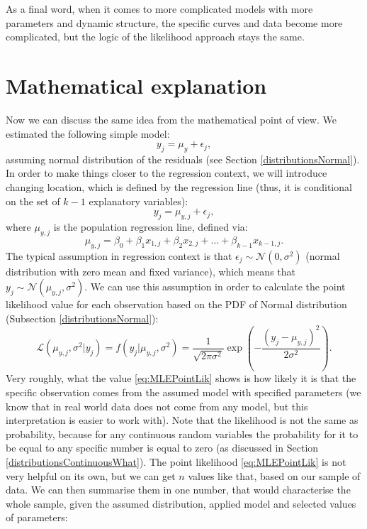 \documentclass[
]{book}
\theoremstyle{definition}
\theoremstyle{definition}
\theoremstyle{definition}
\theoremstyle{definition}
\theoremstyle{remark}
\begin{document}
As a final word, when it comes to more complicated models with more parameters and dynamic structure, the specific curves and data become more complicated, but the logic of the likelihood approach stays the same.

\section{Mathematical explanation}\label{likelihoodApproachMaths}

Now we can discuss the same idea from the mathematical point of view. We estimated the following simple model:
\begin{equation}
    y_j = \mu_{y} + \epsilon_j,
    \label{eq:MLEConstant}
\end{equation}
assuming normal distribution of the residuals (see Section \ref{distributionsNormal}). In order to make things closer to the regression context, we will introduce changing location, which is defined by the regression line (thus, it is conditional on the set of \(k-1\) explanatory variables):
\begin{equation}
    y_j = \mu_{y,j} + \epsilon_j,
    \label{eq:MLESimpleRegression}
\end{equation}
where \(\mu_{y,j}\) is the population regression line, defined via:
\begin{equation}
    \mu_{y,j} = \beta_0 + \beta_1 x_{1,j}+ \beta_2 x_{2,j} + \dots + \beta_{k-1} x_{k-1,j} .
    \label{eq:MLERegression}
\end{equation}
The typical assumption in regression context is that \(\epsilon_j \sim \mathcal{N}(0, \sigma^2)\) (normal distribution with zero mean and fixed variance), which means that \(y_j \sim \mathcal{N}(\mu_{y,j}, \sigma^2)\). We can use this assumption in order to calculate the point likelihood value for each observation based on the PDF of Normal distribution (Subsection \ref{distributionsNormal}):
\begin{equation}
    \mathcal{L} (\mu_{y,j}, \sigma^2 | y_j) = f(y_j | \mu_{y,j}, \sigma^2) = \frac{1}{\sqrt{2 \pi \sigma^2}} \exp \left( -\frac{\left(y_j - \mu_{y,j} \right)^2}{2 \sigma^2} \right).
    \label{eq:MLEPointLik}
\end{equation}
Very roughly, what the value \eqref{eq:MLEPointLik} shows is how likely it is that the specific observation comes from the assumed model with specified parameters (we know that in real world data does not come from any model, but this interpretation is easier to work with). Note that the likelihood is not the same as probability, because for any continuous random variables the probability for it to be equal to any specific number is equal to zero (as discussed in Section \ref{distributionsContinuousWhat}). The point likelihood \eqref{eq:MLEPointLik} is not very helpful on its own, but we can get \(n\) values like that, based on our sample of data. We can then summarise them in one number, that would characterise the whole sample, given the assumed distribution, applied model and selected values of parameters:
\end{document}
